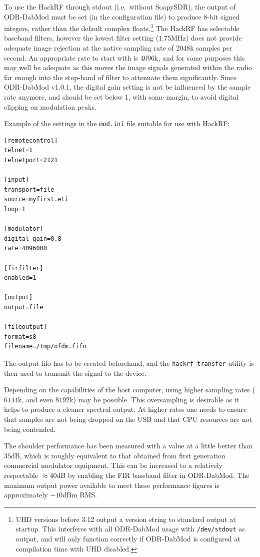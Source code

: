 To use the HackRF through stdout (i.e.\ without SoapySDR),
the output of ODR-DabMod must be set (in the configuration file) to
produce 8-bit signed integers, rather than the default complex
floats.\footnote{UHD versions before 3.12 output a version string to standard output
at startup. This interferes with all ODR-DabMod usage with \texttt{/dev/stdout}
as output, and will only function correctly if ODR-DabMod is configured at
compilation time with UHD disabled.}
The HackRF has selectable baseband filters, however the lowest filter setting
($1.75$MHz) does not provide adequate image rejection at the native sampling rate of
$2048$k samples per second. An appropriate rate to start with is $4096$k, and for
some purposes this may well be adequate as this moves the image signals
generated within the radio far enough into the stop-band of filter to attenuate
them significantly. Since ODR-DabMod v1.0.1, the digital gain setting is not
be influenced by the sample rate anymore, and should be set below 1, with some
margin, to avoid digital clipping on modulation peaks.

Example of the settings in the \texttt{mod.ini} file suitable for use with HackRF:

\begin{lstlisting}
[remotecontrol]
telnet=1
telnetport=2121

[input]
transport=file
source=myfirst.eti
loop=1

[modulator]
digital_gain=0.8
rate=4096000

[firfilter]
enabled=1

[output]
output=file

[fileoutput]
format=s8
filename=/tmp/ofdm.fifo

\end{lstlisting}

The output fifo has to be created beforehand, and the \texttt{hackrf\_transfer}
utility is then used to transmit the signal to the device.

Depending on the capabilities of the host computer, using higher sampling rates
($6144$k, and even $8192$k) may be possible. This oversampling is desirable as
it helps to produce a cleaner spectral output. At higher rates one needs to
ensure that samples are not being dropped on the USB and that CPU resources are
not being contended.

The shoulder performance has been measured with a value at a little
better than $35$dB, which is roughly equivalent to that obtained from first
generation commercial modulator equipment. This can be increased to a relatively
respectable $\approx 40$dB by enabling the FIR baseband filter in ODR-DabMod.
The maximum output power available to meet these performance figures is
approximately $-10$dBm RMS.

